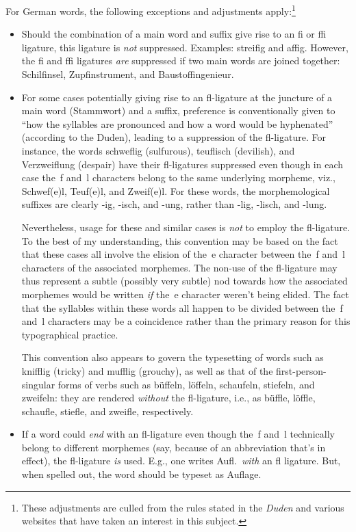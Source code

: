 \documentclass[12pt]{article}
\begin{document}
For German words, the following exceptions and adjustments apply:\footnote{These adjustments are culled from the rules stated in the \emph{Duden} and  various websites that have taken an interest in this subject.}
\begin{itemize}
\item Should the combination of a main word and suffix give rise to an fi or ffi ligature, this ligature is \emph{not} suppressed. Examples: streifig and affig. However, the fi and ffi ligatures \emph{are} suppressed if two main words are joined together: Schilfinsel, Zupfinstrument, and Baustoffingenieur.

\item For some cases potentially giving rise to an fl-ligature at the juncture of a main word (Stammwort) and a suffix, preference is conventionally given to \enquote{how the syllables are pronounced and how a word would be hyphenated} (according to the Duden), leading to a suppression of the fl-ligature. For instance, the words schweflig (sulfurous), teuflisch (devilish), and Verzweiflung (despair) have their fl-ligatures suppressed even though in each case the~f and~l characters belong to the same underlying morpheme, {viz.}, Schwef(e)l, Teuf(e)l, and Zweif(e)l. For these words, the morphemological suffixes are clearly -ig, -isch, and -ung,  rather than -lig, -lisch, and -lung. 

Nevertheless, usage for these and similar cases is \emph{not} to employ the fl-ligature. To the best of my understanding, this convention may be based on the fact that these cases all involve the elision of the~e character between the~f and~l characters of the associated morphemes. The non-use of the fl-ligature may thus represent a subtle (possibly very subtle) nod towards how the associated morphemes would be written \emph{if} the~e character weren't being elided. The fact that the syllables within these words all happen to be divided between the~f and~l characters may be a coincidence rather than the primary reason for this typographical practice.

This convention also appears to govern the typesetting of words such as knifflig (tricky) and mufflig (grouchy), as well as that of the first-person-singular forms of verbs such as büffeln, löffeln, schaufeln, stiefeln, and zweifeln: they are rendered \emph{without} the fl-ligature, i.e., as büffle, löffle, schaufle, stiefle, and zweifle, respectively.

\item If a word could \emph{end} with an fl-ligature even though the~f and~l technically belong to different morphemes (say, because of an abbreviation that's in effect), the fl-ligature \emph{is} used. E.g., one writes Aufl.\ \emph{with} an fl ligature. But, when spelled out, the word should be typeset as Auflage.


\end{itemize}
\end{document}

